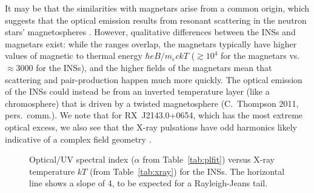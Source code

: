 \documentclass[iop]{emulateapj}
\newcommand{\rbsb}{RX~J2143.0+0654}
\begin{document}
It may be that the similarities with magnetars arise from a common
origin, which suggests that the optical emission results from resonant
scattering in the neutron stars' magnetospheres \citet{lg06}.
However, qualitative differences between the INSs and magnetars exist:
while the ranges overlap, the magnetars typically have higher values
of magnetic to thermal energy $\hbar e B/m_e c k T$ ($\gtrsim 10^4$ for the magnetars
vs.\ $\approx 3000$ for the INSs), and the higher fields of the
magnetars mean that scattering and pair-production happen much more
quickly.  The optical emission of the INSs could instead be from an
inverted temperature layer (like a chromosphere) that is driven by a
twisted magnetosphere (C.~Thompson 2011, pers.\ comm.).  We note that
for \rbsb, which has the most extreme optical excess, we also see that
the X-ray pulsations have odd harmonics likely indicative of a complex
field geometry \citep{kvk09}.



\begin{figure}
\caption{Optical/UV spectral index ($\alpha$ from
 Table~\ref{tab:plfit}) versus X-ray temperature $kT$ (from
 Table~\ref{tab:xray}) for the INSs.  The horizontal line shows a
 slope of 4, to be expected for a Rayleigh-Jeans tail.
}
\label{fig:ktslope}
\end{figure}
\end{document}
